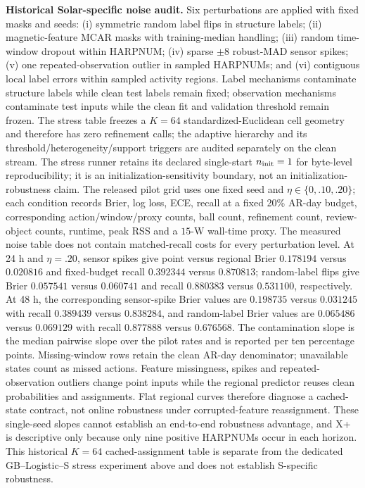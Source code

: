 \documentclass[11pt,a4paper]{article}
\numberwithin{equation}{section}
\theoremstyle{definition}\newtheorem{definition}[theorem]{Definition}
\theoremstyle{remark}\newtheorem{remark}[theorem]{Remark}
\begin{document}
\textbf{Historical Solar-specific noise audit.} Six perturbations are applied with fixed masks and seeds: (i) symmetric random label flips in structure labels; (ii) magnetic-feature MCAR masks with training-median handling; (iii) random time-window dropout within HARPNUM; (iv) sparse $\pm8$ robust-MAD sensor spikes; (v) one repeated-observation outlier in sampled HARPNUMs; and (vi) contiguous local label errors within sampled activity regions. Label mechanisms contaminate structure labels while clean test labels remain fixed; observation mechanisms contaminate test inputs while the clean fit and validation threshold remain frozen. The stress table freezes a $K=64$ standardized-Euclidean cell geometry and therefore has zero refinement calls; the adaptive hierarchy and its threshold/heterogeneity/support triggers are audited separately on the clean stream. The stress runner retains its declared single-start $n_{\rm init}=1$ for byte-level reproducibility; it is an initialization-sensitivity boundary, not an initialization-robustness claim. The released pilot grid uses one fixed seed and $\eta\in\{0,.10,.20\}$; each condition records Brier, log loss, ECE, recall at a fixed 20\% AR-day budget, corresponding action/window/proxy counts, ball count, refinement count, review-object counts, runtime, peak RSS and a $15$-W wall-time proxy. The measured noise table does not contain matched-recall costs for every perturbation level. At 24 h and $\eta=.20$, sensor spikes give point versus regional Brier $0.178194$ versus $0.020816$ and fixed-budget recall $0.392344$ versus $0.870813$; random-label flips give Brier $0.057541$ versus $0.060741$ and recall $0.880383$ versus $0.531100$, respectively. At 48 h, the corresponding sensor-spike Brier values are $0.198735$ versus $0.031245$ with recall $0.389439$ versus $0.838284$, and random-label Brier values are $0.065486$ versus $0.069129$ with recall $0.877888$ versus $0.676568$. The contamination slope is the median pairwise slope over the pilot rates and is reported per ten percentage points. Missing-window rows retain the clean AR-day denominator; unavailable states count as missed actions. Feature missingness, spikes and repeated-observation outliers change point inputs while the regional predictor reuses clean probabilities and assignments. Flat regional curves therefore diagnose a cached-state contract, not online robustness under corrupted-feature reassignment. These single-seed slopes cannot establish an end-to-end robustness advantage, and X+ is descriptive only because only nine positive HARPNUMs occur in each horizon. This historical $K=64$ cached-assignment table is separate from the dedicated GB--Logistic--S stress experiment above and does not establish S-specific robustness.
\end{document}
